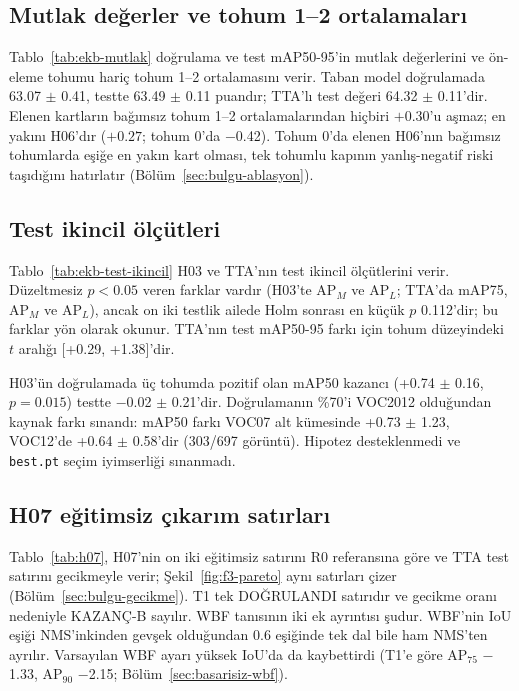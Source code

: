 \subsection{Mutlak değerler ve tohum 1--2 ortalamaları}



Tablo~\ref{tab:ekb-mutlak} doğrulama ve test mAP50-95'in mutlak değerlerini ve ön-eleme tohumu hariç tohum 1--2 ortalamasını verir. Taban model doğrulamada 63.07 $\pm$ 0.41, testte 63.49 $\pm$ 0.11 puandır; TTA'lı test değeri 64.32 $\pm$ 0.11'dir. Elenen kartların bağımsız tohum 1--2 ortalamalarından hiçbiri $+0.30$'u aşmaz; en yakını H06'dır ($+0.27$; tohum 0'da $-$0.42). Tohum 0'da elenen H06'nın bağımsız tohumlarda eşiğe en yakın kart olması, tek tohumlu kapının yanlış-negatif riski taşıdığını hatırlatır (Bölüm~\ref{sec:bulgu-ablasyon}).

\subsection{Test ikincil ölçütleri}



Tablo~\ref{tab:ekb-test-ikincil} H03 ve TTA'nın test ikincil ölçütlerini verir. Düzeltmesiz $p<0.05$ veren farklar vardır (H03'te AP$_M$ ve AP$_L$; TTA'da mAP75, AP$_M$ ve AP$_L$), ancak on iki testlik ailede Holm sonrası en küçük $p$ 0.112'dir; bu farklar yön olarak okunur. TTA'nın test mAP50-95 farkı için tohum düzeyindeki $t$ aralığı [+0.29, +1.38]'dir.

H03'ün doğrulamada üç tohumda pozitif olan mAP50 kazancı (+0.74 $\pm$ 0.16, $p=0.015$) testte $-$0.02 $\pm$ 0.21'dir. Doğrulamanın \%70'i VOC2012 olduğundan kaynak farkı sınandı: mAP50 farkı VOC07 alt kümesinde +0.73 $\pm$ 1.23, VOC12'de +0.64 $\pm$ 0.58'dir (303/697 görüntü). Hipotez desteklenmedi ve \texttt{best.pt} seçim iyimserliği sınanmadı.

\subsection{H07 eğitimsiz çıkarım satırları}



Tablo~\ref{tab:h07}, H07'nin on iki eğitimsiz satırını R0 referansına göre ve TTA test satırını gecikmeyle verir; Şekil~\ref{fig:f3-pareto} aynı satırları çizer (Bölüm~\ref{sec:bulgu-gecikme}). T1 tek DOĞRULANDI satırıdır ve gecikme oranı nedeniyle KAZANÇ-B sayılır. WBF tanısının iki ek ayrıntısı şudur. WBF'nin IoU eşiği NMS'inkinden gevşek olduğundan 0.6 eşiğinde tek dal bile ham NMS'ten ayrılır. Varsayılan WBF ayarı yüksek IoU'da da kaybettirdi (T1'e göre AP$_{75}$ $-$1.33, AP$_{90}$ $-$2.15; Bölüm~\ref{sec:basarisiz-wbf}).

